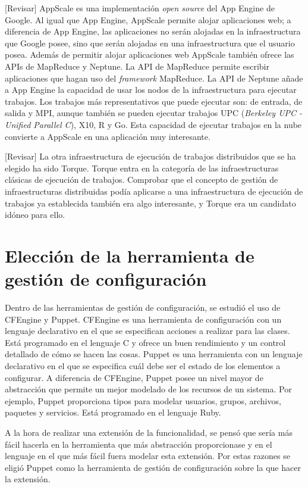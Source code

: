 [Revisar]
AppScale es una implementación \emph{open source} del App Engine de Google. Al igual que App Engine, AppScale permite alojar aplicaciones web; a diferencia de App Engine, las aplicaciones no serán alojadas en la infraestructura que Google posee, sino que serán alojadas en una infraestructura que el usuario posea. Además de permitir alojar aplicaciones web AppScale también ofrece las APIs de MapReduce y Neptune. La API de MapReduce permite escribir aplicaciones que hagan uso del \emph{framework} MapReduce. La API de Neptune añade a App Engine la capacidad de usar los nodos de la infraestructura para ejecutar trabajos. Los trabajos más representativos que puede ejecutar son: de entrada, de salida y MPI, aunque también se pueden ejecutar trabajos UPC (\emph{Berkeley UPC - Unified Parallel C}), X10, R y Go. Esta capacidad de ejecutar trabajos en la nube convierte a AppScale en una aplicación muy interesante.

[Revisar]
La otra infraestructura de ejecución de trabajos distribuidos que se ha elegido ha sido Torque. Torque entra en la categoría de las infraestructuras clásicas de ejecución de trabajos. Comprobar que el concepto de gestión de infraestructuras distribuidas podía aplicarse a una infraestructura de ejecución de trabajos ya establecida también era algo interesante, y Torque era un candidato idóneo para ello.


\section{Elección de la herramienta de gestión de configuración}

Dentro de las herramientas de gestión de configuración, se estudió el uso de CFEngine y Puppet. CFEngine es una herramienta de configuración con un lenguaje declarativo en el que se especifican acciones a realizar para las clases. Está programado en el lenguaje C y ofrece un buen rendimiento y un control detallado de cómo se hacen las cosas. Puppet es una herramienta con un lenguaje declarativo en el que se especifica cuál debe ser el estado de los elementos a configurar. A diferencia de CFEngine, Puppet posee un nivel mayor de abstracción que permite un mejor modelado de los recursos de un sistema. Por ejemplo, Puppet proporciona tipos para modelar usuarios, grupos, archivos, paquetes y servicios. Está programado en el lenguaje Ruby.

A la hora de realizar una extensión de la funcionalidad, se pensó que sería más fácil hacerla en la herramienta que más abstracción proporcionase y en el lenguaje en el que más fácil fuera modelar esta extensión. Por estas razones se eligió Puppet como la herramienta de gestión de configuración sobre la que hacer la extensión.


